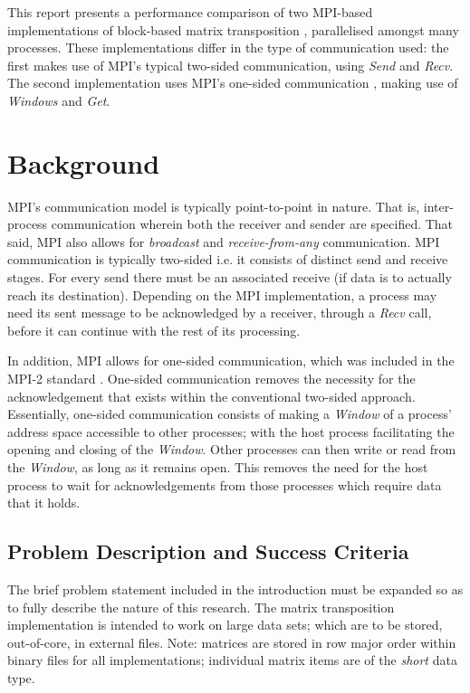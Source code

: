 \documentclass[journal,10pt,a4paper]{IEEEtran}
\begin{document}
This report presents a performance comparison of two MPI-based implementations of block-based matrix transposition \cite{transp}, parallelised amongst many processes. These implementations differ in the type of communication used: the first makes use of MPI's typical two-sided communication, using \textit{Send} and \textit{Recv}. The second implementation uses MPI's one-sided communication \cite{one}, making use of \textit{Windows} and \textit{Get}.

\section{Background}

MPI's communication model is typically point-to-point in nature. That is, inter-process communication wherein both the receiver and sender are specified. That said, MPI also allows for \textit{broadcast} and \textit{receive-from-any} communication. MPI communication is typically two-sided i.e. it consists of distinct send and receive stages. For every send there must be an associated receive (if data is to actually reach its destination). Depending on the MPI implementation, a process may need its sent message to be acknowledged by a receiver, through a \textit{Recv} call, before it can continue with the rest of its processing.

In addition, MPI allows for one-sided communication, which was included in the MPI-2 standard \cite{one,one1}. One-sided communication removes the necessity for the acknowledgement that exists within the conventional two-sided approach. Essentially, one-sided communication consists of making a \textit{Window} of a process' address space accessible to other processes; with the host process facilitating the opening and closing of the \textit{Window}. Other processes can then write or read from the \textit{Window}, as long as it remains open. This removes the need for the host process to wait for acknowledgements from those processes which require data that it holds.


\subsection{Problem Description and Success Criteria}

The brief problem statement included in the introduction must be expanded so as to fully describe the nature of this research. The matrix transposition implementation is intended to work on large data sets; which are to be stored, out-of-core, in external files. Note: matrices are stored in row major order within binary files for all implementations; individual matrix items are of the \textit{short} data type.
\end{document}
